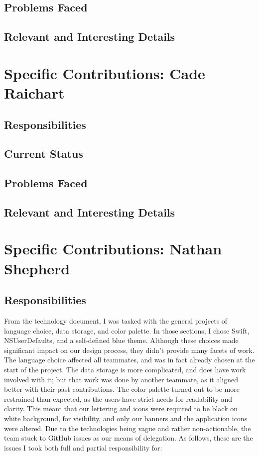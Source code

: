 \documentclass[onecolumn, draftclsnofoot,10pt, compsoc]{IEEEtran}
\begin{document}
\subsection{Problems Faced}
\subsection{Relevant and Interesting Details}

\section{Specific Contributions: Cade Raichart}
\subsection{Responsibilities}
\subsection{Current Status}
\subsection{Problems Faced}
\subsection{Relevant and Interesting Details}

\section{Specific Contributions: Nathan Shepherd}

\subsection{Responsibilities}

From the technology document, I was tasked with the general projects of language choice, data storage, and color palette.
In those sections, I chose Swift, NSUserDefaults, and a self-defined blue theme.
Although these choices made significant impact on our design process, they didn't provide many facets of work.
The language choice affected all teammates, and was in fact already chosen at the start of the project.
The data storage is more complicated, and does have work involved with it; but that work was done by another teammate, as it aligned better with their past contributions.
The color palette turned out to be more restrained than expected, as the users have strict needs for readability and clarity.
This meant that our lettering and icons were required to be black on white background, for visibility, and only our banners and the application icons were altered.
Due to the technologies being vague and rather non-actionable, the team stuck to GitHub issues as our means of delegation.
As follows, these are the issues I took both full and partial responsibility for:
\end{document}
